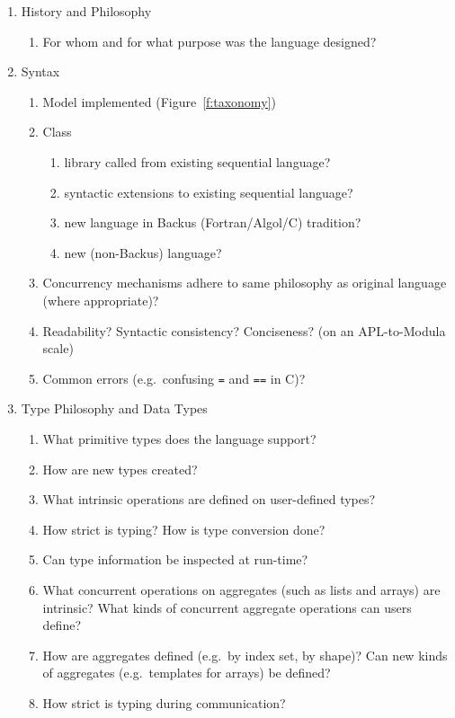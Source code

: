 \begin{enumerate}
\item History and Philosophy
  \begin{enumerate}
  \item For whom and for what purpose was the language designed?
  \end{enumerate}
\item Syntax
  \begin{enumerate}
  \item Model implemented (Figure~\ref{f:taxonomy})
  \item Class
    \begin{enumerate}
    \item library called from existing sequential language?
    \item syntactic extensions to existing sequential language?
    \item new language in Backus (Fortran/Algol/C) tradition?
    \item new (non-Backus) language?
    \end{enumerate}
  \item Concurrency mechanisms adhere to same philosophy as original
	language (where appropriate)?
  \item Readability?  Syntactic consistency?  Conciseness?
	(on an APL-to-Modula scale)
  \item Common errors (e.g.\ confusing {\tt{=}} and {\tt{==}} in C)?
  \end{enumerate}
\item Type Philosophy and Data Types
  \begin{enumerate}
  \item What primitive types does the language support?
  \item How are new types created?
  \item What intrinsic operations are defined on user-defined types?
  \item How strict is typing?
	How is type conversion done?
  \item Can type information be inspected at run-time?
  \item What concurrent operations on aggregates
	(such as lists and arrays) are intrinsic?
	What kinds of concurrent aggregate operations can users define?
  \item How are aggregates defined (e.g.\ by index set, by shape)?
	Can new kinds of aggregates (e.g.\ templates for arrays)
	be defined?
  \item How strict is typing during communication?

\end{enumerate}
\end{enumerate}
